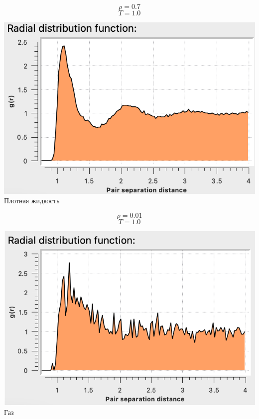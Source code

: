 \begin{minipage}{0.47\textwidth}
    $$ \rho = 0.7$$
    $$T = 1.0 $$
    \begin{center}
        \includegraphics[width=\linewidth]{1.png}\\
        Плотная жидкость
    \end{center}
   
\end{minipage}
\begin{minipage}{0.47\textwidth}
    $$ \rho = 0.01$$
    $$T = 1.0 $$
    \begin{center}
        \includegraphics[width=\linewidth]{2.png}\\
        Газ
    \end{center}
\end{minipage}

\
\newline			


